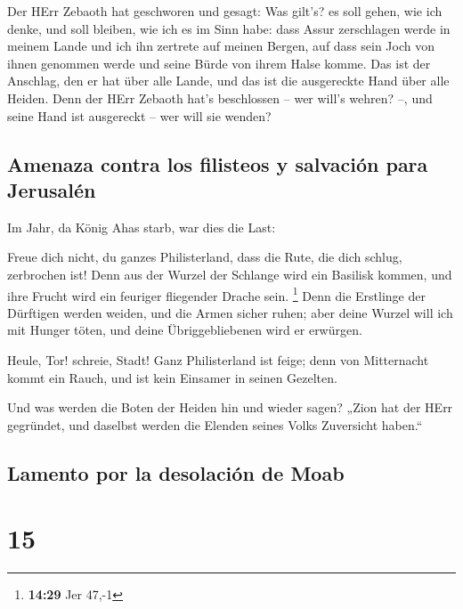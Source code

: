  Der HErr Zebaoth hat geschworen und gesagt: Was gilt's?
es soll gehen, wie ich denke, und soll bleiben, wie ich es im Sinn habe:
 dass Assur zerschlagen werde in meinem Lande und ich ihn
zertrete auf meinen Bergen, auf dass sein Joch von ihnen genommen werde
und seine Bürde von ihrem Halse komme.  Das ist der
Anschlag, den er hat über alle Lande, und das ist die ausgereckte Hand
über alle Heiden.  Denn der HErr Zebaoth hat's
beschlossen -- wer will's wehren? --, und seine Hand ist ausgereckt --
wer will sie wenden?

\hypertarget{amenaza-contra-los-filisteos-y-salvaciuxf3n-para-jerusaluxe9n}{%
\subsection{Amenaza contra los filisteos y salvación para
Jerusalén}\label{amenaza-contra-los-filisteos-y-salvaciuxf3n-para-jerusaluxe9n}}

 Im Jahr, da König Ahas starb, war dies die Last:

 Freue dich nicht, du ganzes Philisterland, dass die
Rute, die dich schlug, zerbrochen ist! Denn aus der Wurzel der Schlange
wird ein Basilisk kommen, und ihre Frucht wird ein feuriger fliegender
Drache sein. \footnote{\textbf{14:29} Jer 47,-1}  Denn
die Erstlinge der Dürftigen werden weiden, und die Armen sicher ruhen;
aber deine Wurzel will ich mit Hunger töten, und deine Übriggebliebenen
wird er erwürgen.

 Heule, Tor! schreie, Stadt! Ganz Philisterland ist
feige; denn von Mitternacht kommt ein Rauch, und ist kein Einsamer in
seinen Gezelten.

 Und was werden die Boten der Heiden hin und wieder
sagen? „Zion hat der HErr gegründet, und daselbst werden die Elenden
seines Volks Zuversicht haben.``

\hypertarget{lamento-por-la-desolaciuxf3n-de-moab}{%
\subsection{Lamento por la desolación de
Moab}\label{lamento-por-la-desolaciuxf3n-de-moab}}

\hypertarget{section-14}{%
\section{15}\label{section-14}}

